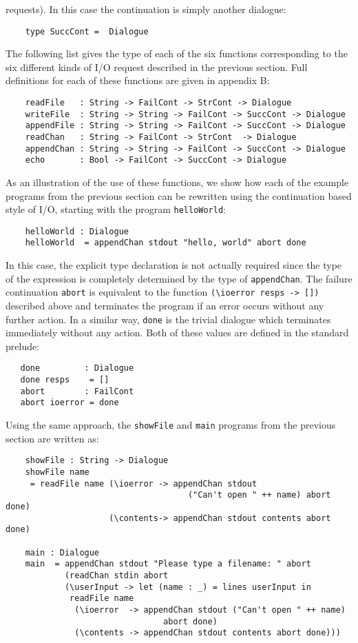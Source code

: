 requests).  In this case the continuation is simply another dialogue:
\begin{verbatim}
    type SuccCont =  Dialogue
\end{verbatim}
The following list  gives  the  type  of  each  of  the  six  functions
corresponding to the six different kinds of I/O  request  described  in
the previous section.  Full definitions for each of these functions are
given in appendix B:
\begin{verbatim}
    readFile   : String -> FailCont -> StrCont -> Dialogue
    writeFile  : String -> String -> FailCont -> SuccCont -> Dialogue
    appendFile : String -> String -> FailCont -> SuccCont -> Dialogue
    readChan   : String -> FailCont -> StrCont  -> Dialogue
    appendChan : String -> String -> FailCont -> SuccCont -> Dialogue
    echo       : Bool -> FailCont -> SuccCont -> Dialogue
\end{verbatim}
As an illustration of the use of these functions, we show how  each  of
the example programs from the previous section can be  rewritten  using
the  continuation  based  style  of  I/O,  starting  with  the  program
\verb"helloWorld":
\begin{verbatim}
    helloWorld : Dialogue
    helloWorld  = appendChan stdout "hello, world" abort done
\end{verbatim}
In this case, the explicit type declaration is  not  actually  required
since the type of the expression is completely determined by  the  type
of \verb"appendChan".  The failure continuation 
\verb"abort" is equivalent to the
function \verb"(\ioerror resps -> [])" described above  and  terminates  the
program if an error occurs without any further action.   In  a  similar
way, \verb"done"  is  the  trivial  dialogue  which  terminates  immediately
without any action.  Both of these values are defined in the standard
prelude:
\begin{verbatim}
   done         : Dialogue
   done resps    = []
   abort        : FailCont
   abort ioerror = done
\end{verbatim} 
Using the same approach, the \verb"showFile" and \verb"main"  programs  from  the
previous section are written as:
\begin{verbatim}
    showFile : String -> Dialogue
    showFile name
     = readFile name (\ioerror -> appendChan stdout
                                     ("Can't open " ++ name) abort done)
                     (\contents-> appendChan stdout contents abort done)
 
    main : Dialogue
    main  = appendChan stdout "Please type a filename: " abort
            (readChan stdin abort
            (\userInput -> let (name : _) = lines userInput in
             readFile name
              (\ioerror  -> appendChan stdout ("Can't open " ++ name)
                                abort done)
              (\contents -> appendChan stdout contents abort done)))
\end{verbatim}

